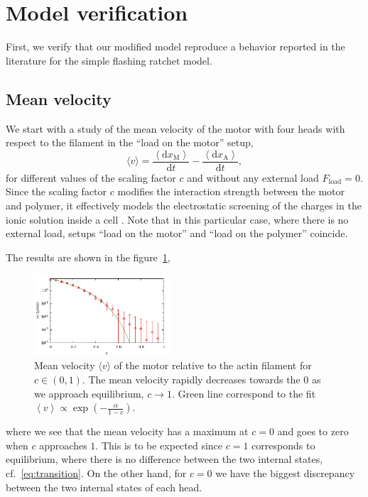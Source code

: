 \documentclass[aps,pre,twocolumn,showpacs,showkeys,superscriptaddress,floatfix]{revtex4-1}
\newcommand{\rmd}{{\mathrm d}}
\begin{document}
\section{Model verification}
First, we verify that our modified model reproduce a behavior reported in the literature for the simple flashing ratchet model. 

\subsection{Mean velocity}
\label{sec:velocity}
We start with a study of the mean velocity of the motor with four heads with respect to the filament in the ``load on the motor'' setup,
\begin{equation}
\langle v \rangle 
= \frac{ \left\langle \rmd x_\text{M} \right\rangle }{ \rmd t } 
- \frac{ \left\langle \rmd x_\text{A} \right\rangle }{ \rmd t } ,
\label{eq:mean_velocity} 
\end{equation}
for different values of the scaling factor $c$ and without any external load $F_\text{load} = 0$.
Since the scaling factor $c$ modifies the interaction strength between the motor and polymer, it effectively models the electrostatic screening of the charges in the ionic solution inside a cell \cite{barterls1993myosin}.
Note that in this particular case, where there is no external load, setups ``load on the motor'' and ``load on the polymer'' coincide. 

The results are shown in the figure~\ref{fig:c_v},
\begin{figure}[t]
\centering
\includegraphics[width=0.45\textwidth,height=!]{c_v_4heads}
\caption{
\label{fig:c_v}
Mean velocity $\langle v \rangle$ of the motor relative to the actin filament for $c \in (0,1)$.
The mean velocity rapidly decreases towards the $0$ as we approach equilibrium, $c \to 1$.  
Green line correspond to the fit $ \left\langle v \right\rangle \propto \exp ( - \frac{\alpha}{1-c} ) $.
} 
\end{figure}
where we see that the mean velocity has a maximum at $c=0$ and goes to zero when $c$ approaches $1$. 
This is to be expected since $c=1$ corresponds to equilibrium, where there is no difference between the two internal states, cf.~\eqref{eq:transition}.
On the other hand, for $c=0$ we have the biggest discrepancy between the two internal states of each head. 
\end{document}
